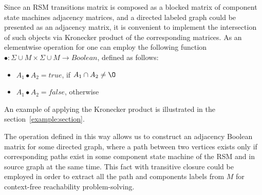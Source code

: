 Since an RSM transitions matrix is composed as a blocked matrix of component state machines adjacency matrices, and a directed labeled graph could be presented as an adjacency matrix, it is convenient to implement the intersection of such objects via Kronecker product of the corresponding matrices. As an elementwise operation for one can employ the following function $\bullet: \Sigma \cup M \times \Sigma \cup M \to Boolean$, defined as follows: 

\begin{itemize}
    \item $A_1 \bullet A_2 = true$, if $A_1 \cap A_2 \neq \O$
    \item $A_1 \bullet A_2 = false$, otherwise
\end{itemize}

An example of applying the Kronecker product is illustrated in the section~\ref{example:section}. 

The operation defined in this way allows us to construct an adjacency Boolean matrix for some directed graph, where a path between two vertices exists only if corresponding paths exist in some component state machine of the RSM and in source graph at the same time. 
This fact with transitive closure could be employed in order to extract all the path and components labels from $M$ for context-free reachability problem-solving.